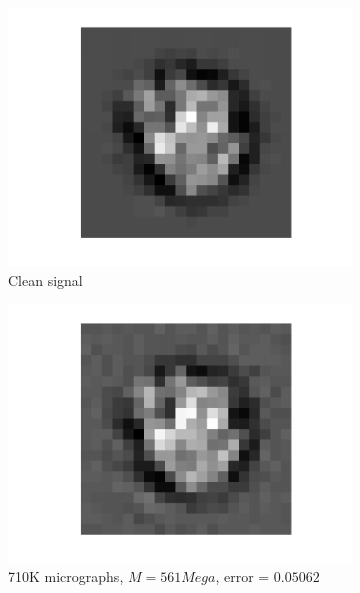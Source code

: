 \documentclass[english]{article}
\numberwithin{equation}{section}
\theoremstyle{plain}
\theoremstyle{definition}
\theoremstyle{remark}
\theoremstyle{plain}
\theoremstyle{remark}
\theoremstyle{plain}
\theoremstyle{plain}
\begin{document}
\begin{figure}[ht!]
	\begin{subfigure}{.5\textwidth}
	\centering
	\includegraphics[scale=0.5]{signal2D_clean}
	\caption{Clean signal}
	\label{fig:signal2D_clean}
\end{subfigure}%
\begin{subfigure}{.5\textwidth}
	\centering
	\includegraphics[scale=0.5]{signal2D_LS_all_images}
	\caption{710K micrographs, $M=561Mega$, error  = $0.05062$}
	\label{fig:signal2D_LS}
\end{subfigure}
\begin{subfigure}{.5\textwidth}
	\centering

\end{subfigure}
\end{figure}
\end{document}
